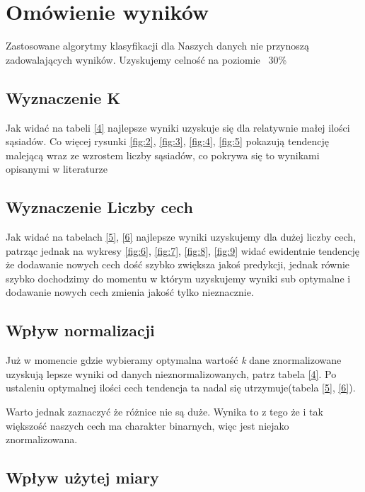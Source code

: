 \section{Omówienie wyników}

	Zastosowane algorytmy klasyfikacji dla Naszych danych nie przynoszą zadowalających wyników. Uzyskujemy celność na poziomie ~30\%
	
	\subsection{Wyznaczenie K}
	
	Jak widać na tabeli \ref{4} najlepsze wyniki uzyskuje się dla relatywnie małej ilości sąsiadów. Co więcej rysunki \ref{fig:2}, \ref{fig:3}, \ref{fig:4}, \ref{fig:5} pokazują tendencję malejącą wraz ze wzrostem liczby sąsiadów, co pokrywa się to wynikami opisanymi w literaturze \cite{3}
	
	\subsection{Wyznaczenie Liczby cech}
	
	Jak widać na tabelach \ref{5}, \ref{6} najlepsze wyniki uzyskujemy dla dużej liczby cech, patrząc jednak na wykresy \ref{fig:6}, \ref{fig:7}, \ref{fig:8}, \ref{fig:9} widać ewidentnie tendencję że dodawanie nowych cech dość szybko zwiększa jakoś predykcji, jednak równie szybko dochodzimy do momentu w którym uzyskujemy wyniki sub optymalne i dodawanie nowych cech zmienia jakość tylko nieznacznie.
	
	\subsection{Wpływ normalizacji}
	
	Już w momencie gdzie wybieramy optymalna wartość \textit{k} dane znormalizowane uzyskują lepsze wyniki od danych nieznormalizowanych, patrz tabela \ref{4}. Po ustaleniu optymalnej ilości cech tendencja ta nadal się utrzymuje(tabela \ref{5}, \ref{6}).
	
	Warto jednak zaznaczyć że różnice nie są duże. Wynika to z tego że i tak większość naszych cech  ma charakter binarnych, więc jest niejako znormalizowana. 
	
	\subsection{Wpływ użytej miary}
	
